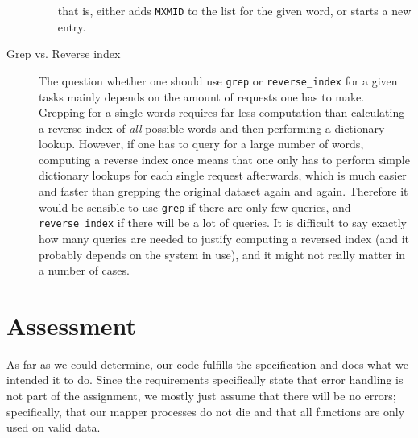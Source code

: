 \documentclass[a4paper]{article}
\begin{document}
\begin{description}
\begin{itemize}
\[      \]
      that is, either adds \texttt{MXMID} to the list for the given word, or starts a new entry.
  \end{itemize}
\item[Grep vs. Reverse index]
  The question whether one should use \texttt{grep} or \texttt{reverse\_index} for a given tasks mainly depends on the amount of requests one has to make. Grepping for a single words requires far less computation than calculating a reverse index of \emph{all} possible words and then performing a dictionary lookup. However, if one has to query for a large number of words, computing a reverse index once means that one only has to perform simple dictionary lookups for each single request afterwards, which is much easier and faster than grepping the original dataset again and again. Therefore it would be sensible to use \texttt{grep} if there are only few queries, and \texttt{reverse\_index} if there will be a lot of queries. It is difficult to say exactly how many queries are needed to justify computing a reversed index (and it probably depends on the system in use), and it might not really matter in a number of cases.
\end{description}

\section*{Assessment}
As far as we could determine, our code fulfills the specification and does what we intended it to do. Since the requirements specifically state that error handling is not part of the assignment, we mostly just assume that there will be no errors; specifically, that our mapper processes do not die and that all functions are only used on valid data.
\end{document}
